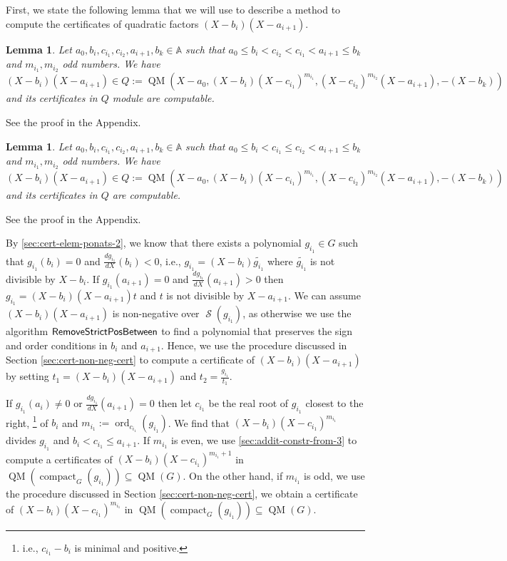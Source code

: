 \documentclass[preprint,12pt,authoryear]{elsarticle}
\newtheorem{lemma}[theorem]{Lemma}
\DeclareMathOperator{\quadmod}{QM}
\DeclareMathOperator{\semialgebraic}{\mathcal{S}}
\DeclareMathOperator{\ord}{ord}
\DeclareMathOperator{\compact}{compact}
\DeclareMathOperator{\algRemoveStrictPosBet}{\sf RemoveStrictPosBetween}
\begin{document}
First, we state the following lemma that we will use to describe a method to
compute the certificates of quadratic factors $(X - b_i)(X - a_{i+1})$.

\begin{lemma}
  \th\label{sec:splitting-step-5} Let
  $a_0, b_i, c_{i_1}, c_{i_2}, a_{i+1}, b_k \in \mathbb{A}$ such that
  $a_0 \leq b_i < c_{i_2} < c_{i_1} < a_{i+1} \leq b_k$ and $m_{i_1}, m_{i_2}$
  odd numbers. We have
  $(X - b_i)(X - a_{i+1}) \in Q := \quadmod(X-a_0, (X - b_i)(X -
  c_{i_1})^{m_{i_1}}, (X - c_{i_2})^{m_{i_2}}(X- a_{i+1}), -(X - b_k))$ and its
  certificates in $Q$ module are computable.
\end{lemma}

See the proof in the Appendix.

\begin{lemma}
  \th\label{sec:cert-quadr-fact} Let
  $a_0, b_i, c_{i_1}, c_{i_2}, a_{i+1}, b_k \in \mathbb{A}$ such that
  $a_0 \leq b_i < c_{i_1} \leq c_{i_2} < a_{i+1} \leq b_k$ and
  $m_{i_1}, m_{i_2}$ odd numbers. We have
  $(X - b_i)(X - a_{i+1}) \in Q := \quadmod(X-a_0, (X - b_i)(X -
  c_{i_1})^{m_{i_1}}, (X - c_{i_2})^{m_{i_2}}(X- a_{i+1}), -(X - b_k))$ and its
  certificates in $Q$ are computable.
\end{lemma}

See the proof in the Appendix.

By \th\ref{sec:cert-elem-ponats-2}, we know that there exists a polynomial
$g_{i_1} \in G$ such that $g_{i_1}(b_i) = 0$ and
$\frac{d g_{i_1}}{dX}(b_i) < 0$, i.e., $g_{i_1} = (X - b_i) \tilde{g_{i_1}}$
where $\tilde{g_{i_1}}$ is not divisible by $X - b_i$. If $g_{i_1}(a_{i+1}) = 0$
and $\frac{d g_{i_1}}{dX}(a_{i+1}) > 0$ then
$g_{i_1} = (X - b_i)(X - a_{i+1}) t$ and $t$ is not divisible by $X -
a_{i+1}$. We can assume $(X - b_i)(X - a_{i+1})$ is non-negative over
$\semialgebraic(g_{i_1})$, as otherwise we use the algorithm
$\algRemoveStrictPosBet$ to find a polynomial that preserves the sign and order
conditions in $b_i$ and $a_{i+1}$. Hence, we use the procedure discussed in
Section \ref{sec:cert-non-neg-cert} to compute a certificate of
$(X - b_i)(X - a_{i+1})$ by setting $t_{1} = (X - b_i)(X - a_{i+1})$ and
$t_{2} = \frac{g_{i_1}}{t_{1}}$.

If $g_{i_1}(a_i) \neq 0$ or $\frac{d g_{i_1}}{dX}(a_{i+1}) = 0$ then let
$c_{i_1}$ be the real root of $g_{i_1}$ closest to the right, \footnote{i.e.,
 $c_{i_1} - b_i$ is minimal and positive.} of $b_i$ and
$m_{i_1} := \ord_{c_{i_1}}(g_{i_1})$. We find that
$(X - b_i)(X - c_{i_1})^{m_{i_1}}$ divides $g_{i_1}$ and
$b_i < c_{i_1} \leq a_{i+1}$. If $m_{i_1}$ is even, we use
\th\ref{sec:addit-constr-from-3} to compute a certificates of
$(X - b_i)(X - c_{i_1})^{m_{i_1} + 1}$ in
$\quadmod(\compact_G(g_{i_1})) \subseteq \quadmod(G)$. On the other hand, if
$m_{i_1}$ is odd, we use the procedure
discussed in Section \ref{sec:cert-non-neg-cert}, we obtain a certificate of
$(X - b_i)(X - c_{i_1})^{m_{i_1}}$ in
$\quadmod(\compact_G(g_{i_1})) \subseteq \quadmod(G)$.
\end{document}
